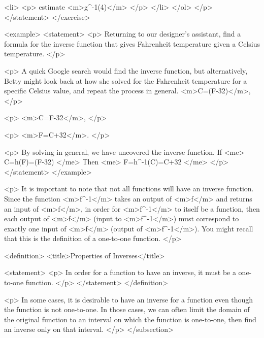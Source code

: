                         <li>
                            <p>
                                estimate <m>g^{-1}(4)</m>
                            </p>
                        </li>
                    </ol>
                </p>
            </statement>
        </exercise>

        <example>
            <statement>
                <p>
                    Returning to our designer’s assistant, find a formula for the inverse function that gives Fahrenheit temperature given a Celsius temperature.
                </p>

                <p>
                    A quick Google search would find the inverse function, but alternatively, Betty might look back at how she solved for the Fahrenheit temperature for a specific Celsius value, and repeat the process in general.
                    <m>C=(F-32)</m>,
                </p>

                <p>
                    <m>C=F-32</m>,
                </p>

                <p>
                    <m>F=C+32</m>.
                </p>

                <p>
                    By solving in general, we have uncovered the inverse function.
                    If
                    <me>
                        C=h(F)=(F-32)
                    </me>
                    Then
                    <me>
                        F=h^{-1}(C)=C+32
                    </me>
                </p>
            </statement>
        </example>

        <p>
            It is important to note that not all functions will have an inverse function.
            Since the function <m>f^{-1}</m> takes an output of <m>f</m> and returns an input of <m>f</m>, in order for <m>f^{-1}</m> to itself be a function, then each output of <m>f</m> (input to <m>f^{-1}</m>) must correspond to exactly one input of <m>f</m> (output of <m>f^{-1}</m>).
            You might recall that this is the definition of a one-to-one function.
        </p>

        <definition>
            <title>Properties of Inverses</title>

            <statement>
                <p>
                    In order for a function to have an inverse, it must be a one-to-one function.
                </p>
            </statement>
        </definition>

        <p>
            In some cases, it is desirable to have an inverse for a function even though the function is not one-to-one.
            In those cases, we can often limit the domain of the original function to an interval on which the function is one-to-one, then find an inverse only on that interval.
        </p>
    </subsection>


